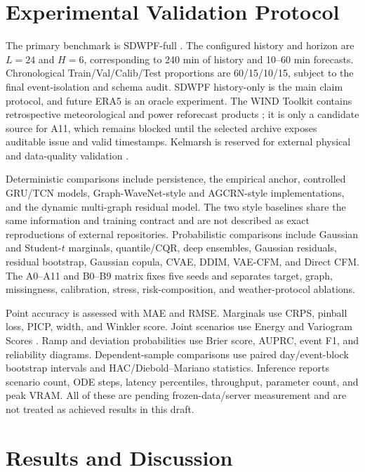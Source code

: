 \documentclass[journal]{IEEEtran}
\begin{document}
\section{Experimental Validation Protocol}

The primary benchmark is SDWPF-full \cite{zhou2024sdwpf}. The configured history and horizon are $L=24$ and $H=6$, corresponding to 240 min of history and 10--60 min forecasts. Chronological Train/Val/Calib/Test proportions are 60/15/10/15, subject to the final event-isolation and schema audit. SDWPF history-only is the main claim protocol, and future ERA5 is an oracle experiment. The WIND Toolkit contains retrospective meteorological and power reforecast products \cite{draxl2015windtoolkit,hodge2016windforecast}; it is only a candidate source for A11, which remains blocked until the selected archive exposes auditable issue and valid timestamps. Kelmarsh is reserved for external physical and data-quality validation \cite{plumley2025kelmarsh}.

Deterministic comparisons include persistence, the empirical anchor, controlled GRU/TCN models, Graph-WaveNet-style and AGCRN-style implementations, and the dynamic multi-graph residual model. The two style baselines share the same information and training contract and are not described as exact reproductions of external repositories. Probabilistic comparisons include Gaussian and Student-$t$ marginals, quantile/CQR, deep ensembles, Gaussian residuals, residual bootstrap, Gaussian copula, CVAE, DDIM, VAE-CFM, and Direct CFM. The A0--A11 and B0--B9 matrix fixes five seeds and separates target, graph, missingness, calibration, stress, risk-composition, and weather-protocol ablations.

Point accuracy is assessed with MAE and RMSE. Marginals use CRPS, pinball loss, PICP, width, and Winkler score. Joint scenarios use Energy and Variogram Scores \cite{gneiting2007proper,scheuerer2015variogram}. Ramp and deviation probabilities use Brier score, AUPRC, event F1, and reliability diagrams. Dependent-sample comparisons use paired day/event-block bootstrap intervals and HAC/Diebold--Mariano statistics. Inference reports scenario count, ODE steps, latency percentiles, throughput, parameter count, and peak VRAM. All of these are pending frozen-data/server measurement and are not treated as achieved results in this draft.

\section{Results and Discussion}
\end{document}
